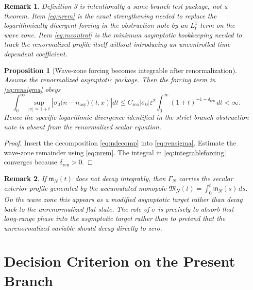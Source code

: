 \documentclass[11pt]{article}
\newtheorem{proposition}{Proposition}
\newtheorem{remark}{Remark}
\begin{document}
\begin{remark}
Definition 3 is intentionally a same-branch test package, not a theorem. Item \eqref{eq:nrem} is the exact strengthening needed to replace the logarithmically divergent forcing in the obstruction note by an \(L_t^1\) term on the wave zone. Item \eqref{eq:mcontrol} is the minimum asymptotic bookkeeping needed to track the renormalized profile itself without introducing an uncontrolled time-dependent coefficient.
\end{remark}

\begin{proposition}[Wave-zone forcing becomes integrable after renormalization]
Assume the renormalized asymptotic package. Then the forcing term in \eqref{eq:rensigma} obeys
\begin{equation}
\int_0^\infty
\sup_{|x|\simeq 1+t}
\left|
\sigma_0\bigl(n-n_{\mathrm{asy}}\bigr)(t,x)
\right|dt
\le
C_{\mathrm{ren}}|\sigma_0|\varepsilon^2
\int_0^\infty (1+t)^{-1-\delta_{\mathrm{ren}}}\,dt
<\infty.
\label{eq:integrableforcing}
\end{equation}
Hence the specific logarithmic divergence identified in the strict-branch obstruction note is absent from the renormalized scalar equation.
\end{proposition}

\begin{proof}
Insert the decomposition \eqref{eq:ndecomp} into \eqref{eq:rensigma}. Estimate the wave-zone remainder using \eqref{eq:nrem}. The integral in \eqref{eq:integrableforcing} converges because \(\delta_{\mathrm{ren}}>0\).
\end{proof}

\begin{remark}
If \(\mathfrak m_N(t)\) does not decay integrably, then \(\Gamma_N\) carries the secular exterior profile generated by the accumulated monopole \(\mathfrak M_N(t)=\int_0^t\mathfrak m_N(s)\,ds\). On the wave zone this appears as a modified asymptotic target rather than decay back to the unrenormalized flat state. The role of \(\widetilde{\sigma}\) is precisely to absorb that long-range phase into the asymptotic target rather than to pretend that the unrenormalized variable should decay directly to zero.
\end{remark}

\section{Decision Criterion on the Present Branch}
\end{document}
